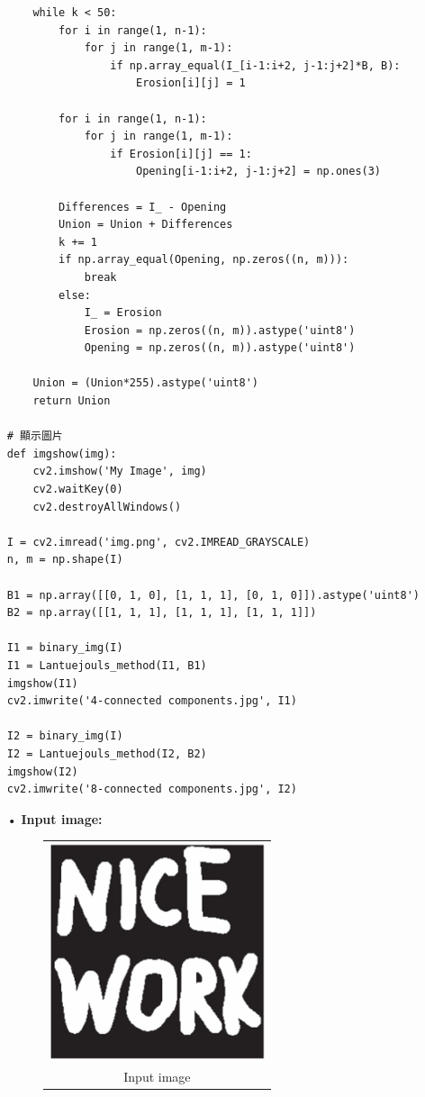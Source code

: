 \documentclass[12pt,a4paper]{article}
\begin{document}
\begin{enumerate}
\begin{lstlisting}
    while k < 50:
        for i in range(1, n-1):
            for j in range(1, m-1):
                if np.array_equal(I_[i-1:i+2, j-1:j+2]*B, B):
                    Erosion[i][j] = 1

        for i in range(1, n-1):
            for j in range(1, m-1):
                if Erosion[i][j] == 1:
                    Opening[i-1:i+2, j-1:j+2] = np.ones(3)

        Differences = I_ - Opening
        Union = Union + Differences
        k += 1
        if np.array_equal(Opening, np.zeros((n, m))):
            break
        else:
            I_ = Erosion
            Erosion = np.zeros((n, m)).astype('uint8')
            Opening = np.zeros((n, m)).astype('uint8')
            
    Union = (Union*255).astype('uint8')
    return Union

# 顯示圖片
def imgshow(img):
    cv2.imshow('My Image', img)
    cv2.waitKey(0)
    cv2.destroyAllWindows()

I = cv2.imread('img.png', cv2.IMREAD_GRAYSCALE)
n, m = np.shape(I)

B1 = np.array([[0, 1, 0], [1, 1, 1], [0, 1, 0]]).astype('uint8')
B2 = np.array([[1, 1, 1], [1, 1, 1], [1, 1, 1]])

I1 = binary_img(I)
I1 = Lantuejouls_method(I1, B1)
imgshow(I1)
cv2.imwrite('4-connected components.jpg', I1)

I2 = binary_img(I)
I2 = Lantuejouls_method(I2, B2)
imgshow(I2)
cv2.imwrite('8-connected components.jpg', I2)

\end{lstlisting}

\newpage
\item[•]
{\bf Input image:}\\
\begin{figure}[h]
\hspace*{12em}
\begin{tabular}{c}
\includegraphics[height=2.5in]{img.png}\\
Input image
\end{tabular}
\end{figure}


\end{enumerate}
\end{document}
